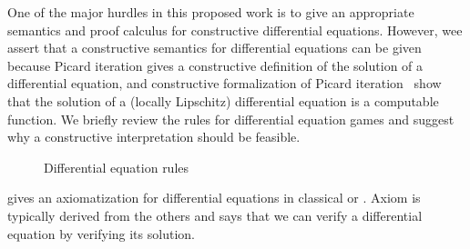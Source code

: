 \documentclass[12pt]{cmuthesis}
\theoremstyle{definition}
\theoremstyle{remark}
\newcommand{\rref}[2][]{\prettyref{#2}}
\newcommand{\lequiv}{\leftrightarrow}
\begin{document}
One of the major hurdles in this proposed work is to give an appropriate semantics and proof calculus for constructive differential equations.
However, wee assert that a constructive semantics for differential equations can be given because Picard iteration gives a constructive definition of the solution of a differential equation, and constructive formalization of Picard iteration~\cite{DBLP:journals/corr/abs-1106-3448,Krebbers+Spitters:lmcs:corn:2011} show that the solution of a (locally Lipschitz) differential equation is a computable function.
We briefly review the \dGL rules for differential equation games and suggest why a constructive interpretation should be feasible.
\begin{figure}
  \centering
  \begin{calculuscollections}{\columnwidth}
    \begin{calculus}
{
}{}
\cinferenceRule[dglweak|DW]{}
{
}{}
\cinferenceRule[dglcut|DC]{}
{
\linferenceRule[lpmi]{\dbox{\pevolvein{\D{x}=f}{\psi}}{\phi}\lequiv \dbox{\pevolvein{\D{x}=f}{\psi \land \rho}}{\phi}}{\dbox{\pevolvein{\D{x}=f}{\psi}}{\rho}}
}{}
\cinferenceRule[dglind|DI]{}
{
}{}
\cinferenceRule[dglghost|DG]{}
{
}{}
\cinferenceRule[dglconst|DS]{}
{
}{}
\cinferenceRule[dglvariant|DV]{}
{
}{}
\end{calculus}
\end{calculuscollections}
\caption{Differential equation rules}
\label{fig:diffeq-rules}
\end{figure}
\rref{fig:diffeq-rules} gives an axiomatization for differential equations in classical \dL or \dGL.
Axiom  is typically derived from the others and says that we can verify a differential equation by verifying its solution.
\end{document}
